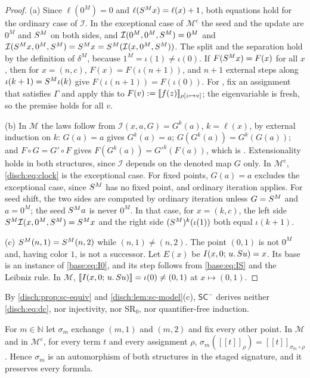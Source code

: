 \begin{proof}
(a) Since $\ell(0^M)=0$ and $\ell(S^M x)=\ell(x)+1$, both equations hold for
the ordinary case of $\mathcal I$. In the exceptional case of
$\mathcal M^{\mathrm c}$ the seed and the update are $0^M$ and $S^M$ on
both sides, and $\mathcal I(0^M,0^M,S^M)=0^M$ and
$\mathcal I(S^M x,0^M,S^M)=S^M x=S^M(\mathcal I(x,0^M,S^M))$.
The split and the separation hold by the definition of $\delta^M$, because
$1^M=\iota(1)\neq\iota(0)$. If $F(S^M x)=F(x)$ for all $x$, then for
$x=(n,c)$, $F(x)=F(\iota(n+1))$, and $n+1$ external steps along
$\iota(k+1)=S^M\iota(k)$ give $F(\iota(n+1))=F(\iota(0))$. For
, fix an assignment that satisfies $\Gamma$ and apply this to
$F(v)\mathrel{:=}[\![f(z)]\!]_{\rho[z\mapsto v]}$; the eigenvariable is fresh, so
the premise holds for all $v$.

(b) In $\mathcal M$ the laws follow from $\mathcal I(x,a,G)=G^{k}(a)$,
$k=\ell(x)$, by external induction on $k$: $G(a)=a$ gives $G^k(a)=a$;
$G(G^k(a))=G^k(G(a))$; and $F\circ G=G'\circ F$ gives
$F(G^k(a))=G'^k(F(a))$, which is . Extensionality holds in
both structures, since $\mathcal I$ depends on the denoted map $G$ only. In
$\mathcal M^{\mathrm c}$, \eqref{disch:eq:clock} is the exceptional case. For
fixed points, $G(a)=a$ excludes the exceptional case, since $S^M$ has no
fixed point, and ordinary iteration applies. For seed shift, the two sides
are computed by ordinary iteration unless $G=S^M$ and $a=0^M$; the seed
$S^M a$ is never $0^M$. In that case, for $x=(k,c)$, the left side
$S^M\mathcal I(x,0^M,S^M)=S^M x$ and the right side
$(S^M)^k(\iota(1))$ both equal $\iota(k+1)$.

(c) $S^M(n,1)=S^M(n,2)$ while $(n,1)\neq(n,2)$. The point $(0,1)$ is
not $0^M$ and, having color $1$, is not a successor. Let $E(x)$ be
$I(x,0;\,u.\,S u)=x$. Its base is an instance of \eqref{base:eq:I0}, and
its step follows from \eqref{base:eq:IS} and the Leibniz rule. In
$\mathcal M$, $[\![I(x,0;\,u.\,S u)]\!]=\iota(0)\neq(0,1)$ at
$x\mapsto(0,1)$.
\end{proof}

By \cref{disch:prop:sc-equiv} and \cref{disch:lem:sc-model}(c),
$\mathsf{SC}^{-}$ derives neither \eqref{disch:eq:dc}, nor injectivity, nor
$\mathrm{SR}_0$, nor quantifier-free induction.

\begin{lemma}
\label{disch:lem:sc-swap}
For $m\in\mathbb N$ let $\sigma_m$ exchange $(m,1)$ and $(m,2)$ and fix every
other point. In $\mathcal M$ and in $\mathcal M^{\mathrm c}$, for every term
$t$ and every assignment $\rho$,
$\sigma_m([\![t]\!]_\rho)=[\![t]\!]_{\sigma_m\circ\rho}$. Hence $\sigma_m$ is
an automorphism of both structures in the staged signature, and it preserves
every formula.
\end{lemma}

